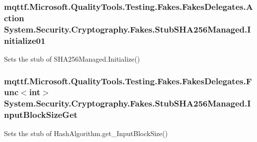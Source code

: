 \hypertarget{class_system_1_1_security_1_1_cryptography_1_1_fakes_1_1_stub_s_h_a256_managed_aa03f3451492495a81f28d0e6da7a159a}{
\subsubsection[{Initialize01}]{\setlength{\rightskip}{0pt plus 5cm}mqttf.\-Microsoft.\-Quality\-Tools.\-Testing.\-Fakes.\-Fakes\-Delegates.\-Action System.\-Security.\-Cryptography.\-Fakes.\-Stub\-S\-H\-A256\-Managed.\-Initialize01}}\label{class_system_1_1_security_1_1_cryptography_1_1_fakes_1_1_stub_s_h_a256_managed_aa03f3451492495a81f28d0e6da7a159a}


Sets the stub of S\-H\-A256\-Managed.\-Initialize()

\hypertarget{class_system_1_1_security_1_1_cryptography_1_1_fakes_1_1_stub_s_h_a256_managed_ae17fb6f6ebdf7beffdecfad20b2eebe1}{
\subsubsection[{Input\-Block\-Size\-Get}]{\setlength{\rightskip}{0pt plus 5cm}mqttf.\-Microsoft.\-Quality\-Tools.\-Testing.\-Fakes.\-Fakes\-Delegates.\-Func$<$int$>$ System.\-Security.\-Cryptography.\-Fakes.\-Stub\-S\-H\-A256\-Managed.\-Input\-Block\-Size\-Get}}\label{class_system_1_1_security_1_1_cryptography_1_1_fakes_1_1_stub_s_h_a256_managed_ae17fb6f6ebdf7beffdecfad20b2eebe1}


Sets the stub of Hash\-Algorithm.\-get\-\_\-\-Input\-Block\-Size()

